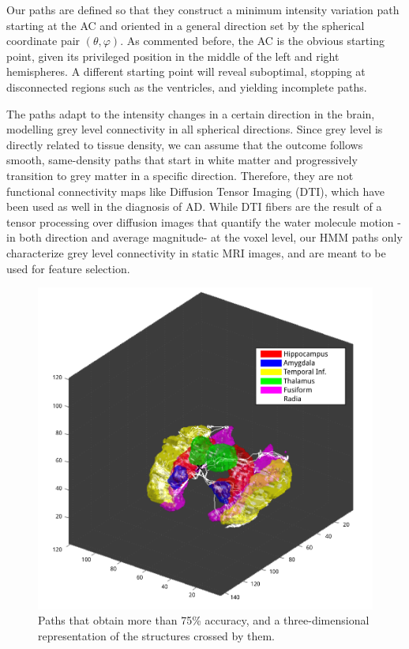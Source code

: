 Our paths are defined so that they construct a minimum intensity variation path starting at the AC and oriented in a general direction set by the spherical coordinate pair $(\theta,\varphi)$. As commented before, the AC is the obvious starting point, given its privileged position in the middle of the left and right hemispheres. A different starting point will reveal suboptimal, stopping at disconnected regions such as the ventricles, and yielding incomplete paths. 

The paths adapt to the intensity changes in a certain direction in the brain, modelling grey level connectivity in all spherical directions. Since grey level is directly related to tissue density, we can assume that the outcome follows smooth, same-density paths that start in white matter and progressively transition to grey matter in a specific direction. Therefore, they are not functional connectivity maps like Diffusion Tensor Imaging (DTI), which have been used as well in the diagnosis of AD\cite{Grana2011,Medina2008}. While DTI fibers are the result of a tensor processing over diffusion images that quantify the water molecule motion -in both direction and average magnitude- at the voxel level, our \ac{HMM} paths only characterize grey level connectivity in static MRI images, and are meant to be used for feature selection. 

\begin{figure}
	\begin{center}
		\includegraphics[width=\columnwidth]{Graphics/ch6/radia&structures}
		\caption{Paths that obtain more than 75\% accuracy, and a three-dimensional representation of the structures crossed by them.}
		\label{fig:bestPaths}
	\end{center}
\end{figure}

